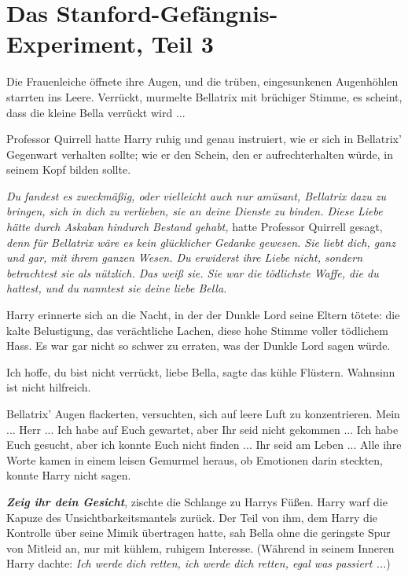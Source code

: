 \chapter{Das Stanford-Gefängnis-Experiment, Teil 3}

Die Frauenleiche öffnete ihre Augen, und die trüben, eingesunkenen Augenhöhlen
starrten ins Leere. \glqq{}Verrückt\grqq{}, murmelte Bellatrix mit brüchiger
Stimme, \glqq{}es scheint, dass die kleine Bella verrückt wird ...\grqq{}

Professor Quirrell hatte Harry ruhig und genau instruiert, wie er sich in
Bellatrix' Gegenwart verhalten sollte; wie er den Schein, den er
aufrechterhalten würde, in seinem Kopf bilden sollte.

\emph{Du fandest es zweckmäßig, oder vielleicht auch nur amüsant, Bellatrix dazu
zu bringen, sich in dich zu verlieben, sie an deine Dienste zu binden. Diese
Liebe hätte durch Askaban hindurch Bestand gehabt,} hatte Professor Quirrell
gesagt, \emph{denn für Bellatrix wäre es kein glücklicher Gedanke gewesen. Sie
liebt dich, ganz und gar, mit ihrem ganzen Wesen. Du erwiderst ihre Liebe nicht,
sondern betrachtest sie als nützlich. Das weiß sie. Sie war die tödlichste
Waffe, die du hattest, und du nanntest sie deine liebe Bella.}

Harry erinnerte sich an die Nacht, in der der Dunkle Lord seine Eltern tötete:
die kalte Belustigung, das verächtliche Lachen, diese hohe Stimme voller
tödlichem Hass. Es war gar nicht so schwer zu erraten, was der Dunkle Lord sagen
würde.

\glqq{}Ich hoffe, du bist nicht verrückt, liebe Bella\grqq{}, sagte das kühle
Flüstern. \glqq{}Wahnsinn ist nicht hilfreich.\grqq{}

Bellatrix' Augen flackerten, versuchten, sich auf leere Luft zu konzentrieren.
\glqq{}Mein ... Herr ... Ich habe auf Euch gewartet, aber Ihr seid nicht
gekommen ... Ich habe Euch gesucht, aber ich konnte Euch nicht finden ... Ihr
seid am Leben ...\grqq{} Alle ihre Worte kamen in einem leisen Gemurmel heraus, ob
Emotionen darin steckten, konnte Harry nicht sagen.

\glqq{}\textbf{\emph{Zeig ihr dein Gesicht}}\grqq{}, zischte die Schlange zu
Harrys Füßen. Harry warf die Kapuze des Unsichtbarkeitsmantels zurück. Der Teil
von ihm, dem Harry die Kontrolle über seine Mimik übertragen hatte, sah Bella
ohne die geringste Spur von Mitleid an, nur mit kühlem, ruhigem Interesse.
(Während in seinem Inneren Harry dachte:\emph{ Ich werde dich retten, ich werde
dich retten, egal was passiert ...})

